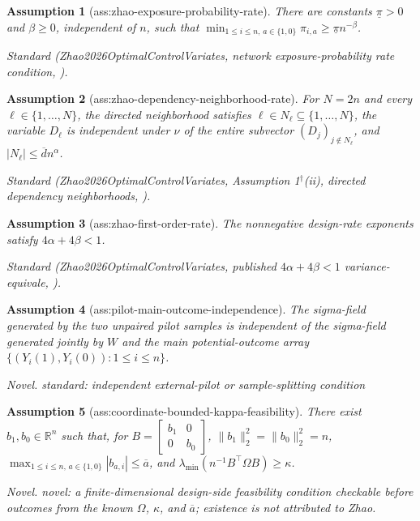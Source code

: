 \documentclass{article}
\newtheorem{assumption}{Assumption}
\begin{document}
\begin{assumption}[ass:zhao-exposure-probability-rate]\label{ass:zhao-exposure-probability-rate}
There are constants \(\underline\pi>0\) and \(\beta\ge0\), independent of \(n\), such that \(\min_{1\le i\le n,\,a\in\{1,0\}}\pi_{i,a}\ge\underline\pi n^{-\beta}\).
\par\smallskip\noindent\emph{Standard} (Zhao2026OptimalControlVariates, network exposure-probability rate condition, \cite{Zhao2026OptimalControlVariates}).
\end{assumption}

\begin{assumption}[ass:zhao-dependency-neighborhood-rate]\label{ass:zhao-dependency-neighborhood-rate}
For \(N=2n\) and every \(\ell\in\{1,\ldots,N\}\), the directed neighborhood satisfies \(\ell\in N_\ell\subseteq\{1,\ldots,N\}\), the variable \(D_\ell\) is independent under \(\nu\) of the entire subvector \((D_j)_{j\notin N_\ell}\), and \(\lvert N_\ell\rvert\le\overline d n^\alpha\).
\par\smallskip\noindent\emph{Standard} (Zhao2026OptimalControlVariates, Assumption 1\(^{\dagger}\)(ii), directed dependency neighborhoods, \cite{Zhao2026OptimalControlVariates}).
\end{assumption}

\begin{assumption}[ass:zhao-first-order-rate]\label{ass:zhao-first-order-rate}
The nonnegative design-rate exponents satisfy \(4\alpha+4\beta<1\).
\par\smallskip\noindent\emph{Standard} (Zhao2026OptimalControlVariates, published \(4\alpha+4\beta<1\) variance-equivale, \cite{Zhao2026OptimalControlVariates}).
\end{assumption}

\begin{assumption}[ass:pilot-main-outcome-independence]\label{ass:pilot-main-outcome-independence}
The sigma-field generated by the two unpaired pilot samples is independent of the sigma-field generated jointly by \(W\) and the main potential-outcome array \(\{(Y_i(1),Y_i(0)):1\le i\le n\}\).
\par\smallskip\noindent\emph{Novel.} standard: independent external-pilot or sample-splitting condition
\end{assumption}

\begin{assumption}[ass:coordinate-bounded-kappa-feasibility]\label{ass:coordinate-bounded-kappa-feasibility}
There exist \(b_1,b_0\in\mathbb R^n\) such that, for \(B=\begin{bmatrix}b_1&0\\0&b_0\end{bmatrix}\), \(\lVert b_1\rVert_2^2=\lVert b_0\rVert_2^2=n\), \(\max_{1\le i\le n,\,a\in\{1,0\}}|b_{a,i}|\le\overline a\), and \(\lambda_{\min}(n^{-1}B^{\top}\Omega B)\ge\kappa\).
\par\smallskip\noindent\emph{Novel.} novel: a finite-dimensional design-side feasibility condition checkable before outcomes from the known \(\Omega\), \(\kappa\), and \(\overline a\); existence is not attributed to Zhao.
\end{assumption}
\end{document}
